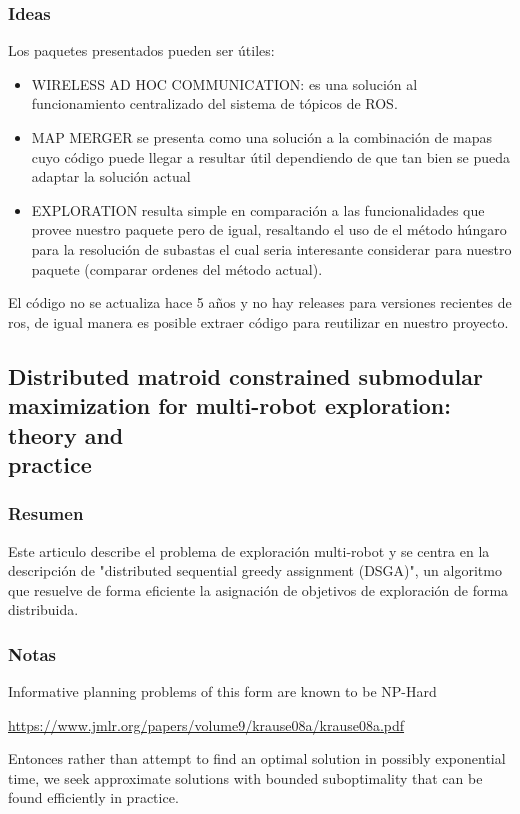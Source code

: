 \subsubsection{Ideas}
Los paquetes presentados pueden ser útiles:
\begin{itemize}
\item WIRELESS AD HOC COMMUNICATION: es una solución al funcionamiento centralizado del sistema de tópicos de ROS.
\item MAP MERGER se presenta como una solución a la combinación de mapas cuyo código puede llegar a resultar útil dependiendo de que tan bien se pueda adaptar la solución actual
\item EXPLORATION resulta simple en comparación a las funcionalidades que provee nuestro paquete pero de igual, resaltando el uso de el método húngaro para la resolución de subastas el cual seria interesante considerar para nuestro paquete (comparar ordenes del método actual).
\end{itemize}

El código no se actualiza hace 5 años y no hay releases para versiones recientes de ros, de igual manera es posible extraer código para reutilizar en nuestro proyecto.

\subsection[Distributed matroid constrained submodular maximization for multi-robot exploration: theory and practice]{Distributed matroid constrained submodular maximization for multi-robot exploration: theory and\\ practice}
\subsubsection{Resumen}
Este articulo describe el problema de exploración multi-robot y se centra en la descripción de "distributed sequential greedy assignment (DSGA)", un algoritmo que resuelve de forma eficiente la asignación de objetivos de exploración de forma distribuida.

\subsubsection{Notas}
Informative planning problems of this form are known to be NP-Hard 

\url{https://www.jmlr.org/papers/volume9/krause08a/krause08a.pdf}

Entonces rather than attempt to find an optimal solution in possibly exponential time, we seek approximate solutions with bounded suboptimality that can be found efficiently in practice.

